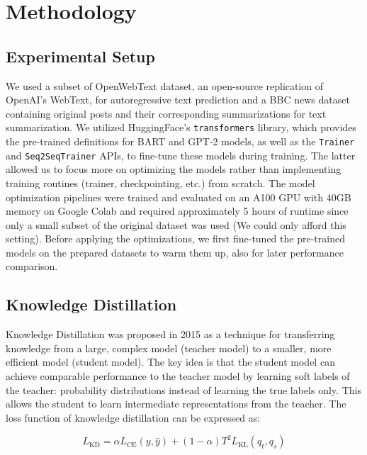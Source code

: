 \documentclass{article}
\begin{document}
    \section{Methodology}
    \subsection{Experimental Setup}
    \hspace*{1em} We used a subset of OpenWebText dataset\cite{OpenWebText2019}, an open-source replication of OpenAI's WebText, for autoregressive text prediction and a BBC news dataset containing original posts and their corresponding summarizations for text summarization. We utilized HuggingFace's \texttt{transformers}\cite{wolf-etal-2020-transformers} library, which provides the pre-trained definitions for BART and GPT-2 models, as well as the \texttt{Trainer} and \texttt{Seq2SeqTrainer} APIs, to fine-tune these models during training. The latter allowed us to focus more on optimizing the models rather than implementing training routines (trainer, checkpointing, etc.) from scratch. The model optimization pipelines were trained and evaluated on an A100 GPU with 40GB memory on Google Colab and required approximately 5 hours of runtime since only a small subset of the original dataset was used (We could only afford this setting). Before applying the optimizations, we first fine-tuned the pre-trained models on the prepared datasets to warm them up, also for later performance comparison.

    \subsection{Knowledge Distillation}
    \hspace*{1em} Knowledge Distillation was proposed in 2015 as a technique for transferring knowledge from a large, complex model (teacher model) to a smaller, more efficient model (student model). The key idea is that the student model can achieve comparable performance to the teacher model by learning soft labels of the teacher: probability distributions instead of learning the true labels only. This allows the student to learn intermediate representations from the teacher. The loss function of knowledge distillation can be expressed as:

    \begin{equation}
        L_{\text{KD}} = \alpha L_{\text{CE}}(y, \hat{y}) + (1 - \alpha) T^2 L_{\text{KL}}(q_t, q_s)
    \end{equation}
\end{document}
